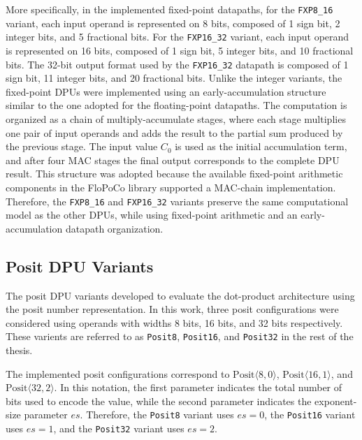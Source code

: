 More specifically, in the implemented fixed-point datapaths, for the \texttt{FXP8\_16} variant, each input operand is represented on 8 bits, composed of 1 sign bit, 2 integer bits, and 5 fractional bits. For the \texttt{FXP16\_32} variant, each input operand is represented on 16 bits, composed of 1 sign bit, 5 integer bits, and 10 fractional bits. The 32-bit output format used by the \texttt{FXP16\_32} datapath is composed of 1 sign bit, 11 integer bits, and 20 fractional bits.
Unlike the integer variants, the fixed-point DPUs were implemented using an early-accumulation structure similar to the one adopted for the floating-point datapaths. The computation is organized as a chain of multiply-accumulate stages, where each stage multiplies one pair of input operands and adds the result to the partial sum produced by the previous stage. The input value $C_0$ is used as the initial accumulation term, and after four MAC stages the final output corresponds to the complete DPU result.
This structure was adopted because the available fixed-point arithmetic components in the FloPoCo library supported a MAC-chain implementation. Therefore, the \texttt{FXP8\_16} and \texttt{FXP16\_32} variants preserve the same computational model as the other DPUs, while using fixed-point arithmetic and an early-accumulation datapath organization.

\subsection{Posit DPU Variants}

The posit DPU variants developed to evaluate the dot-product architecture using the posit number representation. In this work, three posit configurations were considered using operands with widths 8 bits, 16 bits, and 32 bits respectively. These varients are referred to as \texttt{Posit8}, \texttt{Posit16}, and \texttt{Posit32} in the rest of the thesis.

The implemented posit configurations correspond to $\mathrm{Posit}\langle 8,0\rangle$, $\mathrm{Posit}\langle 16,1\rangle$, and $\mathrm{Posit}\langle 32,2\rangle$. In this notation, the first parameter indicates the total number of bits used to encode the value, while the second parameter indicates the exponent-size parameter $es$. Therefore, the \texttt{Posit8} variant uses $es=0$, the \texttt{Posit16} variant uses $es=1$, and the \texttt{Posit32} variant uses $es=2$.


